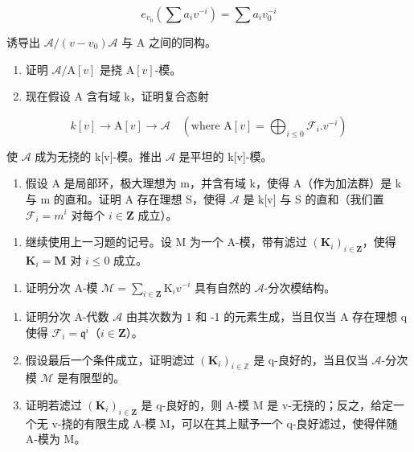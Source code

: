 \[
e _ {v _ {0}} (\sum a _ {i} v ^ {- i}) = \sum a _ {i} v _ {0} ^ {- i}
\]

诱导出 \(\mathcal{A}/(v - v_{0})\mathcal{A}\) 与 A 之间的同构。

\begin{enumerate}
\def\labelenumi{\alph{enumi})}
\setcounter{enumi}{2}
\item
  证明 \(\mathcal{A}/\mathrm{A}[v]\) 是挠 \(\mathrm{A}[v]\)-模。
\item
  现在假设 A 含有域 k，证明复合态射
\end{enumerate}

\[
k [ v ] \rightarrow \mathrm{A} [ v ] \rightarrow \mathcal {A} \quad (\text {where } \mathrm{A} [ v ] = \bigoplus_ {i \leqslant 0} \mathcal {F} _ {i}. v ^ {- i})
\]

使 \(\mathcal{A}\) 成为无挠的 k{[}v{]}-模。推出 \(\mathcal{A}\) 是平坦的 k{[}v{]}-模。

\begin{enumerate}
\def\labelenumi{\alph{enumi})}
\setcounter{enumi}{4}
\tightlist
\item
  假设 A 是局部环，极大理想为 m，并含有域 k，使得 A（作为加法群）是 k 与 m 的直和。证明 A 存在理想 S，使得 \(\mathcal{A}\) 是 k{[}v{]} 与 S 的直和（我们置 \(\mathcal{F}_{i} = m^{i}\) 对每个 \(i \in \mathbf{Z}\) 成立）。
\end{enumerate}

\begin{enumerate}
\def\labelenumi{\arabic{enumi})}
\setcounter{enumi}{2}
\tightlist
\item
  继续使用上一习题的记号。设 M 为一个 A-模，带有滤过 \((\mathbf{K}_i)_{i\in\mathbf{Z}}\)，使得 \(\mathbf{K}_i = \mathbf{M}\) 对 \(i \leqslant 0\) 成立。
\end{enumerate}

\begin{enumerate}
\def\labelenumi{\alph{enumi})}
\tightlist
\item
  证明分次 A-模 \(\mathcal{M} = \sum_{i\in \mathbf{Z}}\mathrm{K}_{i}v^{-i}\) 具有自然的 \(\mathcal{A}\)-分次模结构。
\end{enumerate}



\begin{enumerate}
\def\labelenumi{\alph{enumi})}
\setcounter{enumi}{1}
\item
  证明分次 A-代数 \(\mathcal{A}\) 由其次数为 1 和 -1 的元素生成，当且仅当 A 存在理想 q 使得 \(\mathcal{F}_i = \mathfrak{q}^i\)（\(i \in \mathbf{Z}\)）。
\item
  假设最后一个条件成立，证明滤过 \((\mathbf{K}_i)_{i\in \mathbb{Z}}\) 是 q-良好的，当且仅当 \(\mathcal{A}\)-分次模 \(\mathcal{M}\) 是有限型的。
\item
  证明若滤过 \((\mathbf{K}_{i})_{i\in\mathbf{Z}}\) 是 q-良好的，则 A-模 M 是 v-无挠的；反之，给定一个无 v-挠的有限生成 A-模 M，可以在其上赋予一个 q-良好滤过，使得伴随 A-模为 M。
\end{enumerate}

